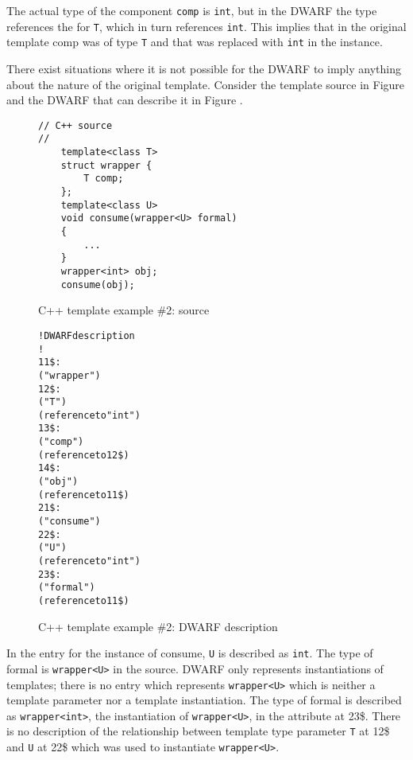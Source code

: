 The actual type of the component \texttt{comp} is \texttt{int}, but in the DWARF
the type references the
\DWTAGtemplatetypeparameter{}
for \texttt{T}, which in turn references \texttt{int}. This implies that in the
original template comp was of type \texttt{T} and that was replaced
with \texttt{int} in the instance. 

There exist situations where it is
not possible for the DWARF to imply anything about the nature
of the original template. 
Consider the  template source in
Figure 
and the DWARF that can describe it in
Figure .

\begin{figure}[!h]
\begin{lstlisting}
// C++ source
//
    template<class T>
    struct wrapper {
        T comp;
    };
    template<class U>
    void consume(wrapper<U> formal)
    {
        ...
    }
    wrapper<int> obj;
    consume(obj);
\end{lstlisting}
\caption{C++ template example \#2: source}
\label{fig:ctemplateexample2source}
\end{figure}

\begin{figure}[h]
\begin{dwflisting}
\begin{alltt}
! DWARF description
!
11\$:  \DWTAGstructuretype
          \DWATname("wrapper")
12\$:      \DWTAGtemplatetypeparameter
              \DWATname("T")
              \DWATtype(reference to "int")
13\$:      \DWTAGmember
              \DWATname("comp")
              \DWATtype(reference to 12\$)
14\$:  \DWTAGvariable
          \DWATname("obj")
          \DWATtype(reference to 11\$)
21\$:  \DWTAGsubprogram
          \DWATname("consume")
22\$:      \DWTAGtemplatetypeparameter
              \DWATname("U")
              \DWATtype(reference to "int")
23\$:      \DWTAGformalparameter
              \DWATname("formal")
              \DWATtype(reference to 11\$)
\end{alltt}
\end{dwflisting}
\caption{C++ template example \#2: DWARF description}
\label{fig:ctemplateexample2dwarf}
\end{figure}

In the \DWTAGsubprogram{} 
entry for the instance of consume, \texttt{U} is described as \texttt{int}. 
The type of formal is \texttt{wrapper\textless U\textgreater} in
the source. DWARF only represents instantiations of templates;
there is no entry which represents \texttt{wrapper\textless U\textgreater} 
which is neither
a template parameter nor a template instantiation. The type
of formal is described as \texttt{wrapper\textless int\textgreater},
the instantiation of \texttt{wrapper\textless U\textgreater},
in the \DWATtype{} attribute at 
23\$. 
There is no
description of the relationship between template type parameter
\texttt{T} at 12\$ and \texttt{U} at 22\$ which was used to instantiate
\texttt{wrapper\textless U\textgreater}.

